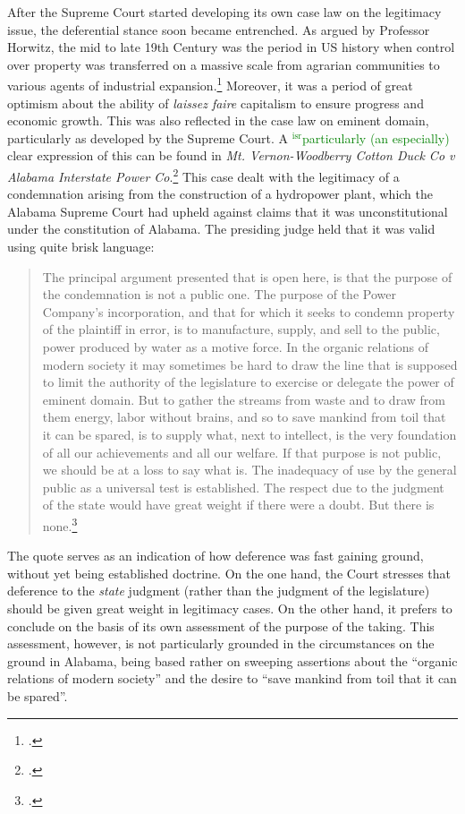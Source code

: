 \documentclass[12pt,a4paper]{book} %
\newcommand{\isr}[1]{\textcolor{green}{$^{\textrm{isr}}${#1}}}
\begin{document}
After the Supreme Court started developing its own case law on the legitimacy issue, the deferential stance soon became entrenched. As argued by Professor Horwitz, the mid to late 19th Century was the period in US history when control over property was transferred on a massive scale from agrarian communities to various agents of industrial expansion.\footcite{horwitz73} Moreover, it was a period of great optimism about the ability of {\it laissez faire} capitalism to ensure progress and economic growth. This was also reflected in the case law on eminent domain, particularly as developed by the Supreme Court. A \isr{particularly (an especially)} clear expression of this can be found in {\it Mt. Vernon-Woodberry Cotton Duck Co v Alabama Interstate Power Co}.\footcite{vernon16}  This case dealt with the legitimacy of a condemnation arising from the construction of a hydropower plant, which the Alabama Supreme Court had upheld against claims that it was unconstitutional under the constitution of Alabama. The presiding judge held that it was valid using quite brisk language:

\begin{quote}The principal argument presented that is open here, is that the purpose of the condemnation is not a public one. The purpose of the Power Company's incorporation, and that for which it seeks to condemn property of the plaintiff in error, is to manufacture, supply, and sell to the public, power produced by water as a motive force. In the organic relations of modern society it may sometimes be hard to draw the line that is supposed to limit the authority of the legislature to exercise or delegate the power of eminent domain. But to gather the streams from waste and to draw from them energy, labor without brains, and so to save mankind from toil that it can be spared, is to supply what, next to intellect, is the very foundation of all our achievements and all our welfare. If that purpose is not public, we should be at a loss to say what is. The inadequacy of use by the general public as a universal test is established. The respect due to the judgment of the state would have great weight if there were a doubt. But there is none.\footcite[]{vernon16}
\end{quote}

The quote serves as an indication of how deference was fast gaining ground, without yet being established doctrine. On the one hand, the Court stresses that deference to the {\it state} judgment (rather than the judgment of the legislature) should be given great weight in legitimacy cases. On the other hand, it prefers to conclude on the basis of its own assessment of the purpose of the taking. This assessment, however, is not particularly grounded in the circumstances on the ground in Alabama, being based rather on sweeping assertions about the ``organic relations of modern society'' and the desire to ``save mankind from toil that it can be spared''. 
\end{document}
